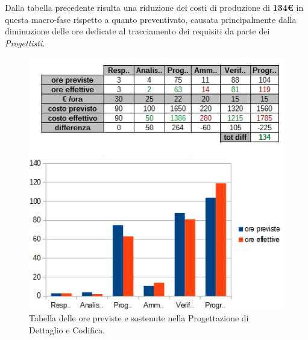 \clearpage
Dalla tabella precedente risulta una riduzione dei costi di produzione di \textbf{134€} in questa macro-fase rispetto a quanto preventivato, causata principalmente dalla diminuzione delle ore dedicate al tracciamento dei requisiti da parte dei \textit{Progettisti}.

\begin{figure}[H]
\begin{center}
\includegraphics[scale=0.70]{img/consuntivo-progdet-tot.png}
\caption{Tabella delle ore previste e sostenute nella Progettazione di Dettaglio e Codifica.}
\end{center}
\end{figure}

